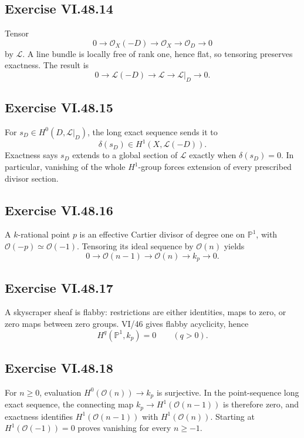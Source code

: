 \subsection*{Exercise VI.48.14}
\begin{solution}
Tensor
\[
0\to\mathcal O_X(-D)\to\mathcal O_X\to\mathcal O_D\to0
\]
by \(\mathcal L\).  A line bundle is locally free of rank one, hence flat, so tensoring preserves exactness.  The result is
\[
0\to\mathcal L(-D)\to\mathcal L\to\mathcal L|_D\to0.
\]
\end{solution}

\subsection*{Exercise VI.48.15}
\begin{solution}
For \(s_D\in H^0(D,\mathcal L|_D)\), the long exact sequence sends it to
\[
\delta(s_D)\in H^1(X,\mathcal L(-D)).
\]
Exactness says \(s_D\) extends to a global section of \(\mathcal L\) exactly when \(\delta(s_D)=0\).  In particular, vanishing of the whole \(H^1\)-group forces extension of every prescribed divisor section.
\end{solution}

\subsection*{Exercise VI.48.16}
\begin{solution}
A \(k\)-rational point \(p\) is an effective Cartier divisor of degree one on \(\mathbb P^1\), with \(\mathcal O(-p)\simeq\mathcal O(-1)\).  Tensoring its ideal sequence by \(\mathcal O(n)\) yields
\[
0\to\mathcal O(n-1)\to\mathcal O(n)\to k_p\to0.
\]
\end{solution}

\subsection*{Exercise VI.48.17}
\begin{solution}
A skyscraper sheaf is flabby: restrictions are either identities, maps to zero, or zero maps between zero groups.  VI/46 gives flabby acyclicity, hence
\[
H^q(\mathbb P^1,k_p)=0\qquad(q>0).
\]
\end{solution}

\subsection*{Exercise VI.48.18}
\begin{solution}
For \(n\ge0\), evaluation \(H^0(\mathcal O(n))\to k_p\) is surjective.  In the point-sequence long exact sequence, the connecting map \(k_p\to H^1(\mathcal O(n-1))\) is therefore zero, and exactness identifies \(H^1(\mathcal O(n-1))\) with \(H^1(\mathcal O(n))\).  Starting at \(H^1(\mathcal O(-1))=0\) proves vanishing for every \(n\ge-1\).
\end{solution}

